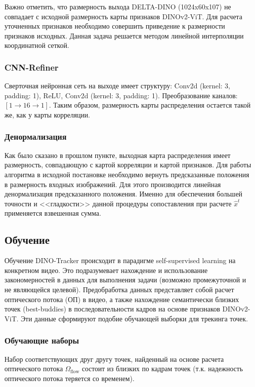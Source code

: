 \documentclass[a4paper, 14pt]{extarticle}
\theoremstyle{definition}
\theoremstyle{plain}
\theoremstyle{remark}
\begin{document}
Важно отметить, что размерность выхода DELTA-DINO (1024x60x107) не совпадает с исходной размерность карты признаков DINOv2-ViT. Для расчета уточненных признаков необходимо совершить приведение к размерности признаков исходных. Данная задача решается методом линейной интерполяции координатной сеткой.

\subsubsection{CNN-Refiner}
Сверточная нейронная сеть на выходе имеет структуру: Conv2d (kernel: 3, padding: 1), ReLU, Conv2d (kernel: 3, padding: 1). Преобразование каналов: $[1 \to 16 \to 1]$. Таким образом, размерность карты распределения остается такой же, как у карты корреляции.



\subsubsection{Денормализация}
Как было сказано в прошлом пункте, выходная карта распределения имеет размерность, совпадающую с картой корреляции и картой признаков.
Для работы алгоритма в исходной постановке необходимо вернуть предсказанные положения в размерность входных изображений. Для этого производится линейная денормализация предсказанного положения. Именно для обеспечения большей точности и <<гладкости>> данной процедуры сопоставления при расчете $\hat{x}^t$ применяется взвешенная сумма.

\subsection{Обучение}
Обучение DINO-Tracker происходит в парадигме self-supervised learning на конкретном видео. 
Это подразумевает нахождение и использование закономерностей в данных для выполнения задачи (возможно промежуточной и не являющейся целевой). 
Предобработка данных представляет собой расчет оптического потока (ОП) в видео, а также нахождение семантически близких точек (best-buddies) в последовательности кадров на основе признаков DINOv2-ViT. Эти данные сформируют подобие обучающей выборки для трекинга точек.

\subsubsection{Обучающие наборы}
Набор соответствующих друг другу точек, найденный на основе расчета оптического потока $\Omega_{\text{flow}}$ состоит из близких по кадрам точек (т.к. надежность оптического потока теряется со временем).
\end{document}
